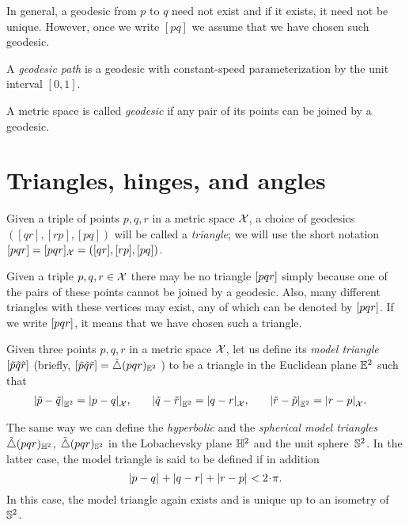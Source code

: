 In general, a geodesic from $p$ to $q$ need not exist and if it exists, it need not  be unique.  
However, once we write $[p q]$ we assume that we have chosen such geodesic.

A \emph{geodesic path} is a geodesic with constant-speed parameterization by the unit interval $[0,1]$.

A metric space is called \emph{geodesic} if any pair of its points can be joined by a geodesic.

\section{Triangles, hinges, and angles}

Given a triple of points $p,q,r$ in a metric space $\mathcal{X}$, a choice of geodesics $([q r], [r p], [p q])$ will be called a \emph{triangle}; we will use the short notation 
$[pqr]=[pqr]_{\mathcal{X}}=([q r], [r p], [p q])$\index{$\trig {{*}}{{*}}{{*}}$}.

Given a triple $p,q,r\in \mathcal{X}$ there may be no triangle 
$[pqr]$ simply because one of the pairs of these points cannot be joined by a geodesic.
Also, many different triangles with these vertices may exist, any of which can be denoted by $[pqr]$.
If we write $[pqr]$, it means that we have chosen such a triangle.

Given three points $p,q,r$ in a metric space $\mathcal{X}$,
let us define its \emph{model triangle} $[\tilde p\tilde q\tilde r]$ 
(briefly, 
$[\tilde p\tilde q\tilde r]=\tilde\triangle(p q r)_{\mathbb{E}^2}$%
) to be a triangle in the Euclidean plane $\mathbb{E}^2$ such that
\begin{align*}\dist{\tilde p}{\tilde q}{\EE^2}&=\dist{p}{q}{\spc{X}},
&
\quad\dist{\tilde q}{\tilde r}{\EE^2}&=\dist{q}{r}{\spc{X}},
&
\quad\dist{\tilde r}{\tilde p}{\EE^2}&=\dist{r}{p}{\spc{X}}.
\end{align*}

The same way we can define the \emph{hyperbolic} and the \emph{spherical model triangles} $\tilde\triangle(p q r)_{\mathbb{H}^2}$, $\tilde\triangle(p q r)_{\mathbb{S}^2}$
in the Lobachevsky plane $\mathbb{H}^2$ and the unit sphere~$\mathbb{S}^2$.
In the latter case, the model triangle is said to be defined if in addition
\[\dist{p}{q}{}+\dist{q}{r}{}+\dist{r}{p}{}< 2\cdot\pi.\]
In this case, the model triangle again exists and is unique up to an isometry of~$\mathbb{S}^2$.

